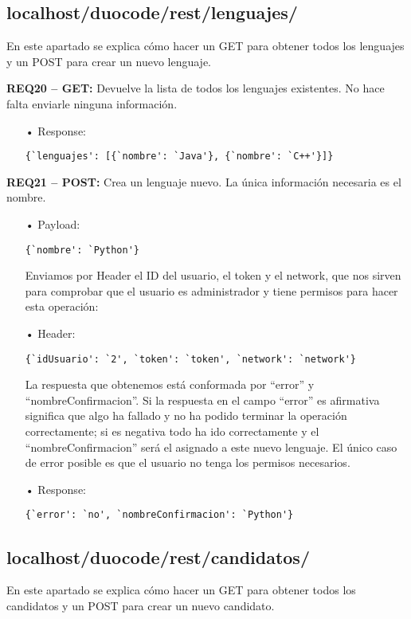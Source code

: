 \subsection{localhost/duocode/rest/lenguajes/}
En este apartado se explica cómo hacer un GET para obtener todos los lenguajes y un POST para crear un nuevo lenguaje.

\textbf{REQ20 – GET:} Devuelve la lista de todos los lenguajes existentes. No hace falta enviarle ninguna información.
\begin{itemize}
\item[•]
Response:
{\codesize
\begin{verbatim} 
{`lenguajes': [{`nombre': `Java'}, {`nombre': `C++'}]}
\end{verbatim}
}
\end{itemize}

\textbf{REQ21 – POST:} Crea un lenguaje nuevo. La única información necesaria es el nombre.
\begin{itemize}
\item[•]
Payload: 
{\codesize
\begin{verbatim}
{`nombre': `Python'}
\end{verbatim}
}

Enviamos por Header el ID del usuario, el token y el network, que nos sirven para comprobar que el usuario es administrador y tiene permisos para hacer esta operación:
\item[•]
Header: 
{\codesize
\begin{verbatim}
{`idUsuario': `2', `token': `token', `network': `network'}
\end{verbatim}
}

La respuesta que obtenemos está conformada por ``error'' y ``nombreConfirmacion''. Si la respuesta en el campo ``error'' es afirmativa significa que algo ha fallado y no ha podido terminar la operación correctamente; si es negativa todo ha ido correctamente y el ``nombreConfirmacion'' será el asignado a este nuevo lenguaje. El único caso de error posible es que el usuario no tenga los permisos necesarios.
\item[•]
Response: 
{\codesize
\begin{verbatim}
{`error': `no', `nombreConfirmacion': `Python'}
\end{verbatim}
}
\end{itemize}

\subsection{localhost/duocode/rest/candidatos/}
En este apartado se explica cómo hacer un GET para obtener todos los candidatos y un POST para crear un nuevo candidato.

